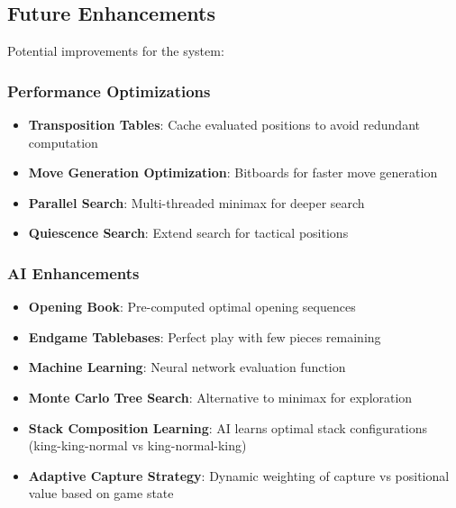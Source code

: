 \documentclass[12pt,a4paper]{article}
\begin{document}
\subsection{Future Enhancements}

Potential improvements for the system:

\subsubsection{Performance Optimizations}
\begin{itemize}
    \item \textbf{Transposition Tables}: Cache evaluated positions to avoid redundant computation
    \item \textbf{Move Generation Optimization}: Bitboards for faster move generation
    \item \textbf{Parallel Search}: Multi-threaded minimax for deeper search
    \item \textbf{Quiescence Search}: Extend search for tactical positions
\end{itemize}

\subsubsection{AI Enhancements}
\begin{itemize}
    \item \textbf{Opening Book}: Pre-computed optimal opening sequences
    \item \textbf{Endgame Tablebases}: Perfect play with few pieces remaining
    \item \textbf{Machine Learning}: Neural network evaluation function
    \item \textbf{Monte Carlo Tree Search}: Alternative to minimax for exploration
    \item \textbf{Stack Composition Learning}: AI learns optimal stack configurations (king-king-normal vs king-normal-king)
    \item \textbf{Adaptive Capture Strategy}: Dynamic weighting of capture vs positional value based on game state
\end{itemize}
\end{document}
